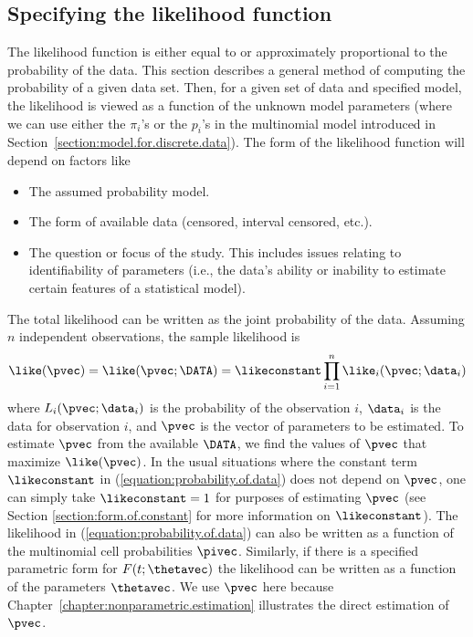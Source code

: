 \subsection{Specifying the likelihood function}
\label{section:probability.of.data}
The likelihood function is either equal to or approximately proportional
to the probability of the data.
This section describes a general method of computing the
probability of a given data set. Then, 
for a given set of data and specified model, the likelihood is viewed as
a function of the unknown model parameters (where we can use either the
$\pi_{i}$'s or the $p_{i}$'s in the multinomial model introduced in
Section~\ref{section:model.for.discrete.data}).
The form of the likelihood
function will depend on factors like
\begin{itemize}
\item
The assumed probability model.
\item
The form of available data (censored, interval censored, etc.).
\item
The question or focus of the study. This includes
issues relating to identifiability of parameters (i.e., the data's ability
or inability to estimate certain features of a statistical model).
\end{itemize}

The total likelihood can be written as
the joint probability of the data.  Assuming $n$ independent
observations, the sample likelihood is
\begin{equation}
\label{equation:probability.of.data}
\like(\pvec)= \like(\pvec;\DATA)= \likeconstant \prod_{i=1}^{n}
\like_{i}(\pvec;\data_{i})
\end{equation}
where $L_{i}(\pvec;\data_{i})$ is the probability of the observation $i$,
$\data_{i}$ is the data for observation $i$, and $\pvec$ is the vector
of parameters to be estimated.
To estimate $\pvec$ from the available $\DATA$, we find the values of
$\pvec$ that maximize $\like(\pvec)$.  In the usual situations
where the constant term $\likeconstant$ in
(\ref{equation:probability.of.data}) does not depend on $\pvec$, one can
simply take $\likeconstant=1$ for purposes of estimating
$\pvec$ (see Section \ref{section:form.of.constant} for more
information on $\likeconstant$).
The likelihood in (\ref{equation:probability.of.data}) can also be
written as a function of the multinomial cell probabilities $\pivec$.
Similarly, if there is a specified parametric form for
$F(t;\thetavec)$ the likelihood can be written as a
function of the parameters $\thetavec$.  We use $\pvec$ here because
Chapter~\ref{chapter:nonparametric.estimation} illustrates the direct
estimation of $\pvec$.

